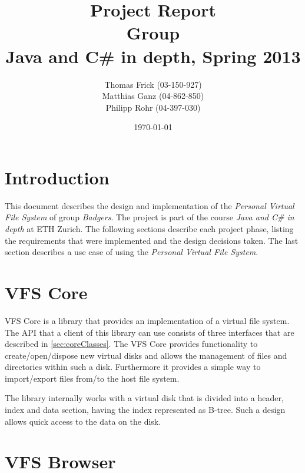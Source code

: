\documentclass[a4paper,12pt]{article}
\title{
Project Report \\ 
Group \groupname \\
\vspace{5mm}
\large Java and C\# in depth, Spring 2013
}
\author{
Thomas Frick (03-150-927)\\
Matthias Ganz (04-862-850)\\
Philipp Rohr (04-397-030)
}
\date{\today}
\newcommand{\groupname}{Badgers\xspace}
\begin{document}
\maketitle


\section{Introduction}

This document describes the design and implementation of the \emph{Personal
Virtual File System} of group \emph{\groupname}. The project is part of the
course \emph{Java and C\# in depth} at ETH Zurich. The following sections
describe each project phase, listing the requirements that were implemented and
the design decisions taken. The last section describes a use case of using the
\emph{Personal Virtual File System}.


\section{VFS Core}



VFS Core is a library that provides an implementation of a virtual file system.
The API that a client of this library can use consists of three interfaces that
are described in \ref{sec:coreClasses}. The VFS Core provides functionality to
create/open/dispose new virtual disks and allows the management of files and
directories within such a disk. Furthermore it provides a simple way to
import/export files from/to the host file system.

The library internally works with a virtual disk that is divided into a header,
index and data section, having the index represented as B-tree. Such a design
allows quick access to the data on the disk.







\section{VFS Browser}
\end{document}
